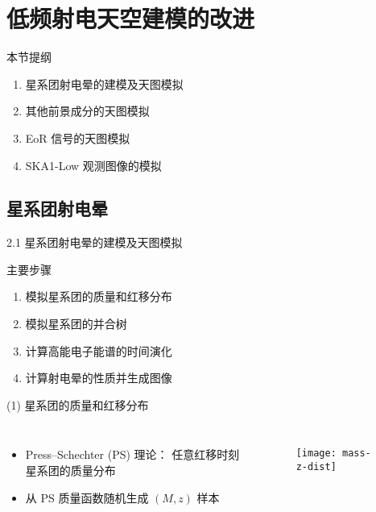 \documentclass{beamer}
\begin{document}
\section{低频射电天空建模的改进}

\begin{frame}
  \begin{block}{本节提纲}
  \begin{enumerate}
    \item 星系团射电晕的建模及天图模拟
    \item 其他前景成分的天图模拟
    \item EoR 信号的天图模拟
    \item SKA1-Low 观测图像的模拟
  \end{enumerate}
  \end{block}
\end{frame}

\subsection{星系团射电晕}

\begin{frame}{2.1 星系团射电晕的建模及天图模拟}
  \begin{alertblock}{主要步骤}
    \begin{enumerate}
      \item 模拟星系团的质量和红移分布
      \item 模拟星系团的并合树
      \item 计算高能电子能谱的时间演化
      \item 计算射电晕的性质并生成图像
    \end{enumerate}
  \end{alertblock}
\end{frame}

\begin{frame}[t]
  \begin{alertblock}{(1) 星系团的质量和红移分布}
  \end{alertblock}
  \begin{columns}
    \begin{itemize}
      \item Press--Schechter (PS) 理论：
        任意红移时刻星系团的质量分布
      \item 从 PS 质量函数随机生成 $(M, z)$ 样本
    \end{itemize}

    \begin{figure}
      \centering
      \texttt{[image: mass-z-dist]}
    \end{figure}
  \end{columns}
\end{frame}
\end{document}
